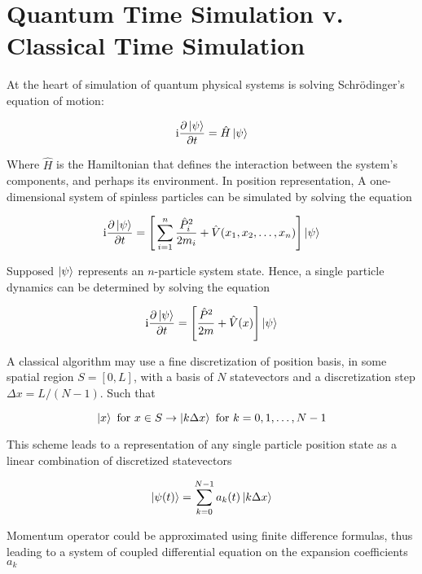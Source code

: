 \section{Quantum Time Simulation v. Classical Time Simulation}

  At the heart of simulation of quantum physical systems is solving Schrödinger's equation of motion:

  \begin{equation}
  \mathrm{i}
  \label{eq:SchEqn}\pdv{\ket{\psi}}{t} = \hat{H} \ket{\psi}
  \end{equation}

  Where $\hat{H}$ is the Hamiltonian that defines the interaction between the system's components, and perhaps its environment. In position representation, A one-dimensional system of spinless particles can be simulated by solving the equation

  \begin{equation}
  \mathrm{i}\pdv{\ket{\psi}}{t} = \Bigg[\sum_{i = 1}^{n} \frac{\hat{P}_i^2}{2m_i} + \hat{V}(x_1, x_2, \ldots, x_n)\Bigg] \ket{\psi}
  \end{equation}

  Supposed $\ket{\psi}$ represents an $n$-particle system state. Hence, a single particle dynamics can be determined by solving the equation

  \begin{equation}
  \mathrm{i}\pdv{\ket{\psi}}{t} = \Bigg[\frac{\hat{P}^2}{2m} + \hat{V}(x)\Bigg] \ket{\psi}
  \end{equation}

  A classical algorithm may use a fine discretization of position basis, in some spatial region $\mathit{S} = [0,L]$, with a basis of $N$ statevectors and a discretization step $\Delta x = L/(N-1)$. Such that

  \begin{equation}
    \ket{x} \text{ for } x \in S \rightarrow \ket{k \Delta x} \text{ for } k = 0,1,\ldots,N-1
  \end{equation}

  This scheme leads to a representation of any single particle position state as a linear combination of discretized statevectors

  \begin{equation}
    \ket{\psi(t)} = \sum_{k = 0}^{N-1} a_k(t) \ket{k \Delta x}
  \end{equation}

  Momentum operator could be approximated using finite difference formulas, thus leading to a system of coupled differential equation on the expansion coefficients $a_k$

